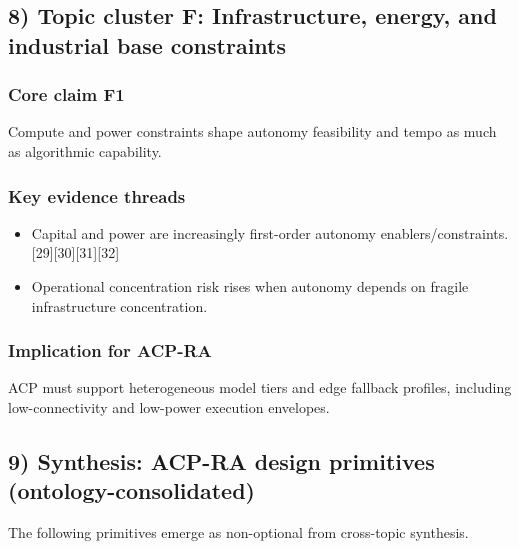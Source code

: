 \documentclass[
]{article}
\providecommand{\tightlist}{%
  \setlength{\itemsep}{0pt}\setlength{\parskip}{0pt}}
\begin{document}
\hypertarget{topic-cluster-f-infrastructure-energy-and-industrial-base-constraints}{%
\subsection{8) Topic cluster F: Infrastructure, energy, and industrial
base
constraints}\label{topic-cluster-f-infrastructure-energy-and-industrial-base-constraints}}

\hypertarget{core-claim-f1}{%
\subsubsection{Core claim F1}\label{core-claim-f1}}

Compute and power constraints shape autonomy feasibility and tempo as
much as algorithmic capability.

\hypertarget{key-evidence-threads-5}{%
\subsubsection{Key evidence threads}\label{key-evidence-threads-5}}

\begin{itemize}
\tightlist
\item
  Capital and power are increasingly first-order autonomy
  enablers/constraints. {[}29{]}{[}30{]}{[}31{]}{[}32{]}
\item
  Operational concentration risk rises when autonomy depends on fragile
  infrastructure concentration.
\end{itemize}

\hypertarget{implication-for-acp-ra-5}{%
\subsubsection{Implication for ACP-RA}\label{implication-for-acp-ra-5}}

ACP must support heterogeneous model tiers and edge fallback profiles,
including low-connectivity and low-power execution envelopes.

\hypertarget{synthesis-acp-ra-design-primitives-ontology-consolidated}{%
\subsection{9) Synthesis: ACP-RA design primitives
(ontology-consolidated)}\label{synthesis-acp-ra-design-primitives-ontology-consolidated}}

The following primitives emerge as non-optional from cross-topic
synthesis.
\end{document}
